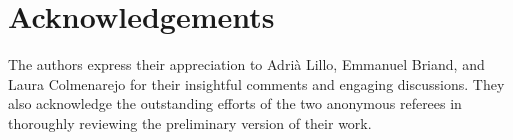 \documentclass[twoside]{article}
\begin{document}
\section*{Acknowledgements}

The authors express their appreciation to Adrià Lillo, Emmanuel Briand, and Laura Colmenarejo for their insightful comments and engaging discussions. They also acknowledge the outstanding efforts of the two anonymous referees in thoroughly reviewing the preliminary version of their work.


\end{document}

